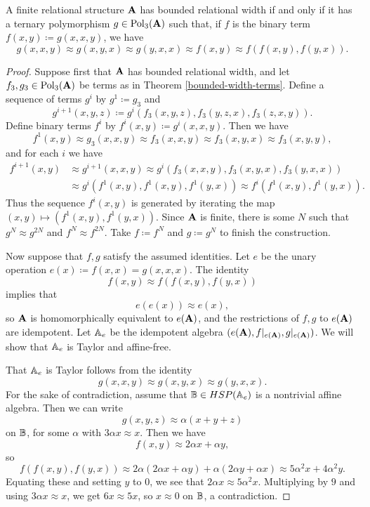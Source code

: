 \documentclass[letterpaper,11pt]{article}
\DeclareMathOperator{\Pol}{Pol}
\begin{document}
\begin{thm}\label{bounded-width-term} A finite relational structure $\mathbf{A}$ has bounded relational width if and only if it has a ternary polymorphism $g \in \Pol_3(\fA)$ such that, if $f$ is the binary term $f(x,y) \coloneqq g(x,x,y)$, we have
\[
g(x,x,y) \approx g(x,y,x) \approx g(y,x,x) \approx f(x,y) \approx f(f(x,y),f(y,x)).
\]
\end{thm}
\begin{proof} Suppose first that $\mathbf{A}$ has bounded relational width, and let $f_3, g_3 \in \Pol_3(\fA)$ be terms as in Theorem \ref{bounded-width-terms}. Define a sequence of terms $g^i$ by $g^1 \coloneqq g_3$ and
\[
g^{i+1}(x,y,z) \coloneqq g^i(f_3(x,y,z),f_3(y,z,x),f_3(z,x,y)).
\]
Define binary terms $f^i$ by $f^i(x,y) \coloneqq g^i(x,x,y)$. Then we have
\[
f^1(x,y) \approx g_3(x,x,y) \approx f_3(x,x,y) \approx f_3(x,y,x) \approx f_3(x,y,y),
\]
and for each $i$ we have
\begin{align*}
f^{i+1}(x,y) &\approx g^{i+1}(x,x,y) \approx g^i(f_3(x,x,y), f_3(x,y,x), f_3(y,x,x))\\
&\approx g^i(f^1(x,y),f^1(x,y),f^1(y,x)) \approx f^i(f^1(x,y),f^1(y,x)).
\end{align*}
Thus the sequence $f^i(x,y)$ is generated by iterating the map $(x,y) \mapsto (f^1(x,y),f^1(y,x))$. Since $\mathbf{A}$ is finite, there is some $N$ such that $g^N \approx g^{2N}$ and $f^N \approx f^{2N}$. Take $f \coloneqq f^N$ and $g \coloneqq g^N$ to finish the construction.

Now suppose that $f,g$ satisfy the assumed identities. Let $e$ be the unary operation $e(x) \coloneqq f(x,x) = g(x,x,x)$. The identity
\[
f(x,y) \approx f(f(x,y),f(y,x))
\]
implies that
\[
e(e(x)) \approx e(x),
\]
so $\mathbf{A}$ is homomorphically equivalent to $e(\mathbf{A})$, and the restrictions of $f,g$ to $e(\mathbf{A})$ are idempotent. Let $\mathbb{A}_e$ be the idempotent algebra $(e(\mathbf{A}), f|_{e(\mathbf{A})}, g|_{e(\mathbf{A})})$. We will show that $\mathbb{A}_e$ is Taylor and affine-free.

That $\mathbb{A}_e$ is Taylor follows from the identity
\[
g(x,x,y) \approx g(x,y,x) \approx g(y,x,x).
\]
For the sake of contradiction, assume that $\mathbb{B} \in HSP(\mathbb{A}_e)$ is a nontrivial affine algebra. Then we can write
\[
g(x,y,z) \approx \alpha(x+y+z)
\]
on $\mathbb{B}$, for some $\alpha$ with $3\alpha x \approx x$. Then we have
\[
f(x,y) \approx 2\alpha x + \alpha y,
\]
so
\[
f(f(x,y),f(y,x)) \approx 2\alpha(2\alpha x + \alpha y) + \alpha(2\alpha y + \alpha x) \approx 5\alpha^2 x + 4\alpha^2 y.
\]
Equating these and setting $y$ to $0$, we see that $2\alpha x \approx 5\alpha^2 x$. Multiplying by $9$ and using $3\alpha x \approx x$, we get $6x \approx 5x$, so $x \approx 0$ on $\mathbb{B}$, a contradiction.
\end{proof}
\end{document}
